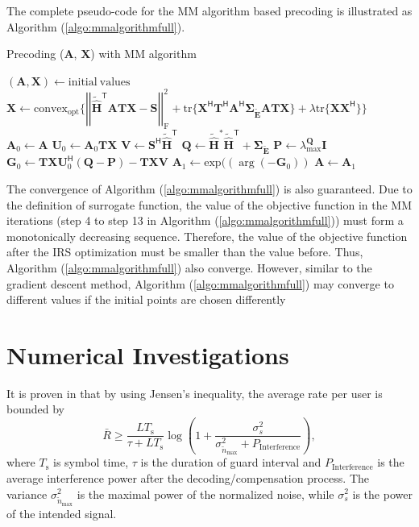 \documentclass[12pt,draftclsnofoot,onecolumn,journal]{IEEEtran}
\begin{document}
The complete pseudo-code for the MM algorithm based precoding is illustrated as Algorithm (\ref{algo:mmalgorithmfull}).
\begin{algorithm}
\caption{Precoding ($\mathbf{A}$, $\mathbf{X}$) with MM algorithm}
\begin{algorithmic}[1]
\State $ (\mathbf{A}, \mathbf{X}) \gets \mathrm{initial\ values} $
\State $\mathbf{X}\gets\mathrm{convex_{opt}}\{\left|\left|\tilde{\hat{\mathbf H}}^{\mathsf T}\mathbf{ATX}-\mathbf{S}\right|\right|_{\mathrm{F}}^2+\mathrm{tr}\{\mathbf X^{\mathsf H}\mathbf T^{\mathsf H}\mathbf A^{\mathsf H}\pmb{\Sigma_{\tilde{\mathbf E}}}\mathbf{ATX}\}+\lambda\mathrm{tr}\{\mathbf X\mathbf X^{\mathsf H}\}\}$
	\State $\mathbf A_0\gets \mathbf A$
	\State $\mathbf U_0 \gets  \mathbf A_0\mathbf{TX}$
	\State $\mathbf V\gets\mathbf S^{\mathsf H}\tilde{\hat{\mathbf H}}^{\mathsf T}$
	\State $\mathbf Q\gets\tilde{\hat{\mathbf H}}^*\tilde{\hat{\mathbf H}}^{\mathsf T}+\pmb{\Sigma_{\tilde{\mathbf E}}}$
	\State $\mathbf P\gets\lambda_{\mathrm{max}}^{\mathbf Q}\mathbf I$
	\State $\mathbf G_0\gets\mathbf{TX} \mathbf U_0^{\mathsf H}(\mathbf Q-\mathbf P)-\mathbf{TXV}$
	\State $\mathbf A_1\gets\mathrm{exp}((\arg ( -\mathbf G_0))$
	\State $\mathbf A\gets\mathbf A_1$
\EndWhile
\EndWhile
\end{algorithmic}
\label{algo:mmalgorithmfull}
\end{algorithm}
The convergence of Algorithm (\ref{algo:mmalgorithmfull}) is also guaranteed. Due to the definition of surrogate function, the value of the objective function in the MM iterations (step 4 to step 13 in Algorithm (\ref{algo:mmalgorithmfull})) must form a monotonically decreasing sequence. Therefore, the value of the objective function after the IRS optimization must be smaller than the value before. Thus, Algorithm (\ref{algo:mmalgorithmfull}) also converge. However, similar to the gradient descent method, Algorithm (\ref{algo:mmalgorithmfull}) may converge to different values if the initial points are chosen differently


\section{Numerical Investigations}
It is proven in \cite{sedaghat2017novel} that by using Jensen's inequality, the average rate per user is bounded by
\begin{equation}
\bar R\geq \frac{LT_{\mathrm{s}}}{\tau+LT_{\mathrm{s}}}\log\left(1+\frac{\sigma_s^2}{\sigma_{\tilde{n}_{\mathrm{max}}}^2+P_{\mathrm{Interference}}}\right),
\end{equation}
where $T_{\mathrm{s}}$ is symbol time, $\tau$ is the duration of guard interval and $P_{\mathrm{Interference}}$ is the average interference power after the decoding/compensation process. The variance $\sigma_{\tilde{n}_{\mathrm{max}}}^2$ is the maximal power of the normalized noise, while $\sigma_s^2$ is the power of the intended signal. 
\end{document}
